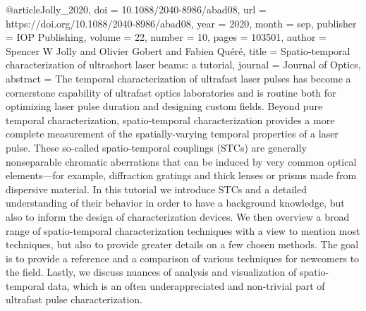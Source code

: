 @article{Jolly_2020,
	doi = {10.1088/2040-8986/abad08},
	url = {https://doi.org/10.1088/2040-8986/abad08},
	year = 2020,
	month = {sep},
	publisher = {{IOP} Publishing},
	volume = {22},
	number = {10},
	pages = {103501},
	author = {Spencer W Jolly and Olivier Gobert and Fabien Qu{\'{e}}r{\'{e}}},
	title = {Spatio-temporal characterization of ultrashort laser beams: a tutorial},
	journal = {Journal of Optics},
	abstract = {The temporal characterization of ultrafast laser pulses has become a cornerstone capability of ultrafast optics laboratories and is routine both for optimizing laser pulse duration and designing custom fields. Beyond pure temporal characterization, spatio-temporal characterization provides a more complete measurement of the spatially-varying temporal properties of a laser pulse. These so-called spatio-temporal couplings (STCs) are generally nonseparable chromatic aberrations that can be induced by very common optical elements—for example, diffraction gratings and thick lenses or prisms made from dispersive material. In this tutorial we introduce STCs and a detailed understanding of their behavior in order to have a background knowledge, but also to inform the design of characterization devices. We then overview a broad range of spatio-temporal characterization techniques with a view to mention most techniques, but also to provide greater details on a few chosen methods. The goal is to provide a reference and a comparison of various techniques for newcomers to the field. Lastly, we discuss nuances of analysis and visualization of spatio-temporal data, which is an often underappreciated and non-trivial part of ultrafast pulse characterization.}
}